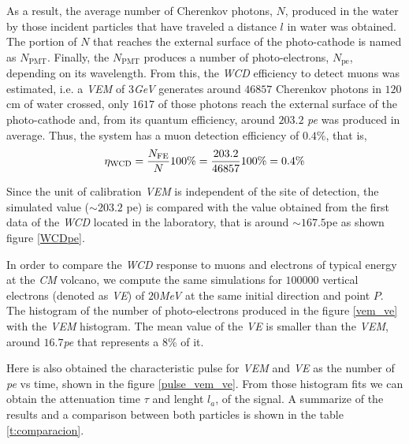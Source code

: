 \documentclass[submitting]{nst}
\begin{document}
As a result, the average number of Cherenkov photons, $N$, produced in the water by those incident particles that have traveled a distance $l$ in water was obtained. The portion of $N$ that reaches the external surface of the photo-cathode is named as $N_{\mathrm{PMT}}$. Finally, the $ N_{\mathrm{PMT}}$ produces a number of photo-electrons, $N_{\mathrm{pe}}$, depending on its wavelength. From this, the \textsl{WCD} efficiency to detect muons was estimated, i.e. a \textsl{VEM} of $3$\textsl{GeV} generates around $46857$ Cherenkov photons in $120$cm of water crossed, only $1617$ of those photons reach the external surface of the photo-cathode and, from its quantum efficiency, around $203.2$ \textsl{pe} was produced in average. Thus, the system has a muon detection efficiency of $0.4$\%, that is,
\begin{equation}
\eta_{\mathrm{WCD}}=\frac{N_{\mathrm{FE}}}{N} 100\%=\frac{203.2}{46857}100\%=0\textnormal{.}4\%
\end{equation}

Since the unit of calibration \textsl{VEM} is independent of the site of detection, the simulated value ($\sim 203.2$ pe) is compared with the value obtained from the first data of the \textsl{WCD} located in the laboratory, that is around $\sim 167.5$pe as shown figure \ref{WCDpe}. 

In order to compare the \textsl{WCD} response to muons and electrons of typical energy at the \textsl{CM} volcano, we compute the same simulations for $100000$ vertical electrons (denoted as \textsl{VE}) of $20$\textsl{MeV} at the same initial direction and point $P$. The histogram of the number of photo-electrons produced in the figure \ref{vem_ve} with the \textsl{VEM} histogram. The mean value of the \textsl{VE} is smaller than the \textsl{VEM}, around $16.7$\textsl{pe} that represents a $8$\% of it.

Here is also obtained the characteristic pulse for \textsl{VEM} and \textsl{VE} as the number of \textsl{pe} vs time, shown in the figure \ref{pulse_vem_ve}. From those histogram fits we can obtain the attenuation time $\tau$ and lenght $l_a$, of the signal. A summarize of the results and a comparison between both particles is shown in the table \ref{t:comparacion}.
\end{document}
